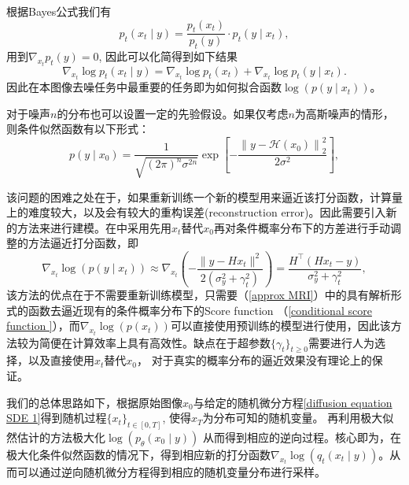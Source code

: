 根据Bayes公式我们有
\begin{equation}
    p_t(x_t\mid y) = \frac{p_t(x_t)}{p_t(y)}\cdot p_t(y\mid x_t),
\end{equation}
用到$\nabla_{x_t}p_t(y)=0$, 因此可以化简得到如下结果
\begin{equation}
\nabla_{x_t} \log p_t\left(x_t \mid y\right)=\nabla_{x_t} \log p_t\left(x_t\right)+\nabla_{x_t} \log p_t\left(y \mid x_t\right).
\label{conditional score function }
\end{equation}
因此在本图像去噪任务中最重要的任务即为如何拟合函数$\log \left(p(y\mid x_t)\right)$。

对于噪声$n$的分布也可以设置一定的先验假设。如果仅考虑$n$为高斯噪声的情形，则条件似然函数有以下形式：
\begin{equation}
 p\left(y \mid x_0\right)=\frac{1}{\sqrt{(2 \pi)^n \sigma^{2 n}}} \exp \left[-\frac{\left\|y-\mathcal{H}\left(x_0\right)\right\|_2^2}{2 \sigma^2}\right],
 \label{log-likelihood gaussion }
\end{equation}

该问题的困难之处在于，如果重新训练一个新的模型用来逼近该打分函数，计算量上的难度较大，以及会有较大的重构误差(reconstruction error)。因此需要引入新的方法来进行建模。在\cite{song_2}中采用先用$x_t$替代$x_0$再对条件概率分布下的方差进行手动调整的方法逼近打分函数，即
\begin{equation}
    \nabla_{x_t}\log\left(p(y\mid x_t)\right) \approx \nabla_{x_t}\left(-\frac{\|y-Hx_t\|^2}{2\left(\sigma_y^2+\gamma_t^2\right)}\right) = \frac{H^{\top}(Hx_t-y)}{\sigma_y^2+\gamma_t^2},
    \label{approx MRI}
\end{equation}
该方法的优点在于不需要重新训练模型，只需要（\ref{approx MRI}）中的具有解析形式的函数去逼近现有的条件概率分布下的Score function （\ref{conditional score function }），而$\nabla_{x_t}\log\left(p(x_t)\right)$可以直接使用预训练的模型进行使用，因此该方法较为简便在计算效率上具有高效性。缺点在于超参数$\{\gamma_t\}_{t\geq 0}$需要进行人为选择，以及直接使用$x_t$替代$x_0$， 对于真实的概率分布的逼近效果没有理论上的保证。



我们的总体思路如下，根据原始图像$x_0$与给定的随机微分方程\ref{diffusion equation SDE 1}得到随机过程$\{x_t\}_{t\in [0,T]}$, 使得$x_T$为分布可知的随机变量。 再利用极大似然估计的方法极大化$\log\left(p_{\theta}(x_0\mid y)\right)$ 从而得到相应的逆向过程。核心即为，在极大化条件似然函数的情况下，得到相应新的打分函数$\nabla_{x_t}\log(q_t(x_t\mid y))$。从而可以通过逆向随机微分方程得到相应的随机变量分布进行采样。

